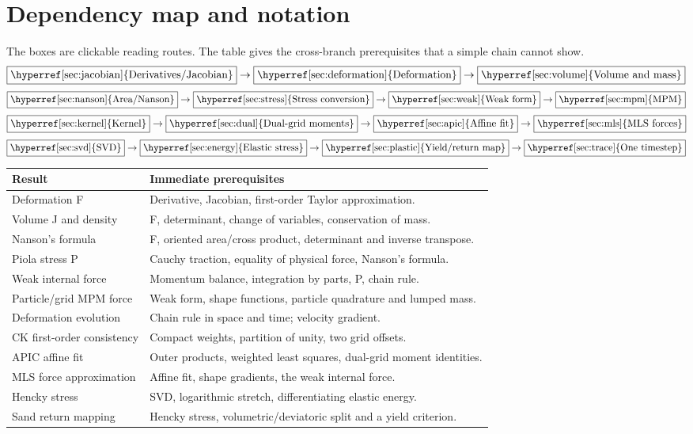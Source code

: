 \documentclass[11pt,a4paper]{article}
\newcommand{\topic}[2]{\boxed{\text{\hyperref[#1]{#2}}}}
\numberwithin{equation}{section}
\begin{document}
\section{Dependency map and notation}\label{sec:map}
The boxes are clickable reading routes. The table gives the cross-branch
prerequisites that a simple chain cannot show.
\[
\topic{sec:jacobian}{Derivatives/Jacobian}\to
\topic{sec:deformation}{Deformation}\to
\topic{sec:volume}{Volume and mass}
\]
\[
\topic{sec:nanson}{Area/Nanson}\to
\topic{sec:stress}{Stress conversion}\to
\topic{sec:weak}{Weak form}\to\topic{sec:mpm}{MPM}
\]
\[
\topic{sec:kernel}{Kernel}\to\topic{sec:dual}{Dual-grid moments}\to
\topic{sec:apic}{Affine fit}\to\topic{sec:mls}{MLS forces}
\]
\[
\topic{sec:svd}{SVD}\to\topic{sec:energy}{Elastic stress}\to
\topic{sec:plastic}{Yield/return map}\to\topic{sec:trace}{One timestep}
\]
\begin{longtable}{>{\raggedright\arraybackslash}p{.29\linewidth}>{\raggedright\arraybackslash}p{.62\linewidth}}
\toprule Result & Immediate prerequisites \\\midrule\endhead
Deformation F & Derivative, Jacobian, first-order Taylor approximation. \\
Volume J and density & F, determinant, change of variables, conservation of mass. \\
Nanson's formula & F, oriented area/cross product, determinant and inverse transpose. \\
Piola stress P & Cauchy traction, equality of physical force, Nanson's formula. \\
Weak internal force & Momentum balance, integration by parts, P, chain rule. \\
Particle/grid MPM force & Weak form, shape functions, particle quadrature and lumped mass. \\
Deformation evolution & Chain rule in space and time; velocity gradient. \\
CK first-order consistency & Compact weights, partition of unity, two grid offsets. \\
APIC affine fit & Outer products, weighted least squares, dual-grid moment identities. \\
MLS force approximation & Affine fit, shape gradients, the weak internal force. \\
Hencky stress & SVD, logarithmic stretch, differentiating elastic energy. \\
Sand return mapping & Hencky stress, volumetric/deviatoric split and a yield criterion. \\\bottomrule
\end{longtable}
\end{document}
